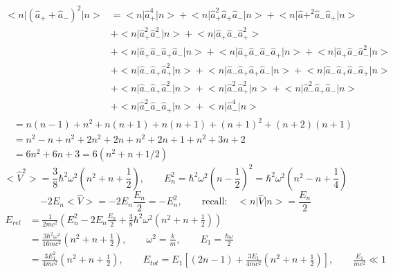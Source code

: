 \documentclass[12pt,fancychapters]{report}
\numberwithin{equation}{section}
\begin{document}
\begin{align*}
  \big<n\big|\left(\hat{a}_{+} + \hat{a}_{-}\right)^2\big|n\big> &=
 \big<n\big|\hat{a}_{+}^4\big|n\big> + \big<n\big| \hat{a}_+^2\hat{a}_{+}\hat{a}_{-}
\big|n\big> + \big<n\big|\hat{a}{+}^2\hat{a}_{-}\hat{a}_{+}\big|n\big>\\
&+\big<n\big|\hat{a}_{+}^2\hat{a}_{-}^2\big|n\big> +\big<n\big|\hat{a}_{+}
\hat{a}_{-}\hat{a}_{+}^2\big> \\
&+\big<n\big|\hat{a}_{+}\hat{a}_{-}\hat{a}_{+}\hat{a}_{-}\big|n\big>
+ \big< n\big|\hat{a}_{+}\hat{a}_{-}\hat{a}_{-}\hat{a}_{+}\big|n\big> + \big<n\big|\hat{a}_{+}
\hat{a}_{-}\hat{a}_{-}^2\big|n\big>\\
&+\big< n\big|\hat{a}_{-}\hat{a}_{+}\hat{a}_{+}^2\big|n\big> + 
\big<n\big|\hat{a}_{-}\hat{a}_{+}\hat{a}_{+}\hat{a}_{-}\big|n\big> + 
\big<n\big|\hat{a}_{-}\hat{a}_{+}\hat{a}_{-}\hat{a}_{+}\big|n\big>\\
&+\big<n\big|\hat{a}_{-}\hat{a}_{+}\hat{a}_{-}^2\big|n\big> + 
\big<n\big|\hat{a}_{-}^2\hat{a}_{+}^2\big|n\big>
+\big<n\big|\hat{a}_{-}^2\hat{a}_{+}\hat{a}_{-}\big|n\big>\\
&+ \big<n\big|\hat{a}_{-}^2\hat{a}_{-}\hat{a}_{+}\big|n\big> +
\big<n\big|\hat{a}_{-}^4\big|n\big>
\end{align*}
\begin{align*}
  &=n(n-1)+n^2+n(n+1)+n(n+1)+(n+1)^2+(n+2)(n+1) \\
  &=n^2-n+n^2+2 n^2+2 n+n^2+2 n+1+n^2+3 n+2 \\
  &=6 n^2+6 n+3=6\left(n^2+n+1 / 2\right)
\end{align*}
\[
  \big<\hat{V}^2\big> = \frac{3}{8}\hbar^2\omega^2\left(n^2+n+\frac{1}{2}\right),
  \qquad E_n^2 = \hbar^2\omega^2 \left(n-\frac{1}{2}\right)^2= 
  \hbar^2 \omega^2\left(n^2 - n + \frac{1}{4}\right)
\]
\[
  -2E_n\big<\hat{V}\big> = -2E_n \frac{E_n}{2} = -E_n^2, \qquad \text{recall:}\quad \big<n\big
  |\hat{V}\big|n\big> = \frac{E_n}{2}
\]
\begin{align*}
  E_{rel} &= \frac{1}{2mc^2}\left(E_n^2 - 2E_n\frac{E_n}{2}+ \frac{3}{8}\hbar^2\omega^2 
  \left(n^2+n+\frac{1}{2}\right)\right)\\
          &= \frac{3\hbar^2\omega^2}{16mc^2}\left(n^2+n+\frac{1}{2}\right), 
          \qquad \omega^2 = \frac{k}{m},\qquad E_1 = \frac{\hbar\omega}{2}\\
          &= \frac{3E_1^2}{4mc^2}\left(n^2+n+\frac{1}{2}\right), \qquad 
          E_{tot} = E_1 \left[(2n-1)+\frac{3E_1}{4mc^2}\left(n^2+n+\frac{1}{2}\right)\right],
          \qquad \frac{E_1}{mc^2}\ll 1
  \end{align*}
\end{document}
